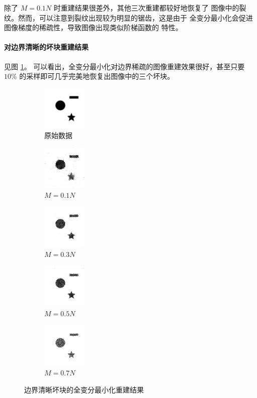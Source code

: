 除了 $M = 0.1N$ 时重建结果很差外，其他三次重建都较好地恢复了
图像中的裂纹。然而，可以注意到裂纹出现较为明显的锯齿，这是由于
全变分最小化会促进图像梯度的稀疏性，导致图像出现类似阶梯函数的
特性。

\paragraph{对边界清晰的坏块重建结果} 见图 \ref{fig:TV2dsharp}。
可以看出，全变分最小化对边界稀疏的图像重建效果很好，甚至只要
$10\%$ 的采样即可几乎完美地恢复出图像中的三个坏块。

\begin{figure}
\centering
\begin{subfigure}[t]{1.1in}
	\includegraphics{Figure/testdata/2dsharp.png}
	\caption{原始数据}
\end{subfigure}
\begin{subfigure}[t]{1.1in}
	\includegraphics{Figure/TV/2dsharp10.png}
	\caption{$M = 0.1 N$}
\end{subfigure}
\begin{subfigure}[t]{1.1in}
	\includegraphics{Figure/TV/2dsharp30.png}
	\caption{$M = 0.3 N$}
\end{subfigure}
\begin{subfigure}[t]{1.1in}
	\includegraphics{Figure/TV/2dsharp50.png}
	\caption{$M = 0.5 N$}
\end{subfigure}
\begin{subfigure}[t]{1.1in}
	\includegraphics{Figure/TV/2dsharp70.png}
	\caption{$M = 0.7 N$}
\end{subfigure}
\caption{边界清晰坏块的全变分最小化重建结果}
\label{fig:TV2dsharp}
\end{figure}

